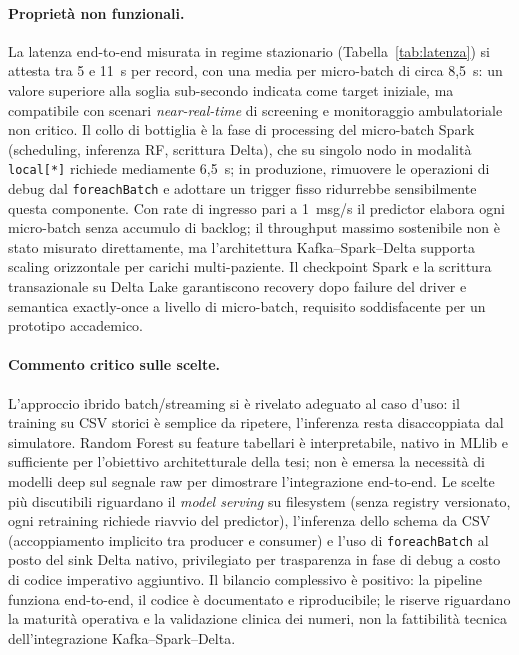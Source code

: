 \paragraph{Proprietà non funzionali.}
La latenza end-to-end misurata in regime stazionario (Tabella~\ref{tab:latenza}) si attesta tra 5 e 11~s per record, con una media per micro-batch di circa 8,5~s: un valore superiore alla soglia sub-secondo indicata come target iniziale, ma compatibile con scenari \emph{near-real-time} di screening e monitoraggio ambulatoriale non critico.
Il collo di bottiglia è la fase di processing del micro-batch Spark (scheduling, inferenza RF, scrittura Delta), che su singolo nodo in modalità \texttt{local[*]} richiede mediamente 6,5~s; in produzione, rimuovere le operazioni di debug dal \texttt{foreachBatch} e adottare un trigger fisso ridurrebbe sensibilmente questa componente.
Con rate di ingresso pari a 1~msg/s il predictor elabora ogni micro-batch senza accumulo di backlog; il throughput massimo sostenibile non è stato misurato direttamente, ma l'architettura Kafka--Spark--Delta supporta scaling orizzontale per carichi multi-paziente.
Il checkpoint Spark e la scrittura transazionale su Delta Lake garantiscono recovery dopo failure del driver e semantica exactly-once a livello di micro-batch, requisito soddisfacente per un prototipo accademico.

\paragraph{Commento critico sulle scelte.}
L'approccio ibrido batch/streaming si è rivelato adeguato al caso d'uso: il training su CSV storici è semplice da ripetere, l'inferenza resta disaccoppiata dal simulatore.
Random Forest su feature tabellari è interpretabile, nativo in MLlib e sufficiente per l'obiettivo architetturale della tesi; non è emersa la necessità di modelli deep sul segnale raw per dimostrare l'integrazione end-to-end.
Le scelte più discutibili riguardano il \emph{model serving} su filesystem (senza registry versionato, ogni retraining richiede riavvio del predictor), l'inferenza dello schema da CSV (accoppiamento implicito tra producer e consumer) e l'uso di \texttt{foreachBatch} al posto del sink Delta nativo, privilegiato per trasparenza in fase di debug a costo di codice imperativo aggiuntivo.
Il bilancio complessivo è positivo: la pipeline funziona end-to-end, il codice è documentato e riproducibile; le riserve riguardano la maturità operativa e la validazione clinica dei numeri, non la fattibilità tecnica dell'integrazione Kafka--Spark--Delta.

